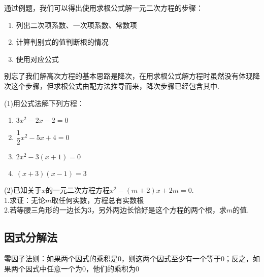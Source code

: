 通过例题，我们可以得出使用求根公式解一元二次方程的步骤：
\begin{enumerate}
    \item 列出二次项系数、一次项系数、常数项
    \item 计算判别式的值判断根的情况
    \item 使用对应公式
\end{enumerate}
\par
别忘了我们解高次方程的基本思路是降次，在用求根公式解方程时虽然没有体现降次这个步骤，但求根公式由配方法推导而来，降次步骤已经包含其中.
\begin{exercise}
\setlength{\parindent}{0pt} %
\setlength{\columnseprule}{0.01pt}
\begin{multicols}{2}
    (1)用公式法解下列方程：
    \begin{enumerate}
        \item \(3x^2-2x-2=0\)
        \item \(\dfrac{1}{2}x^2-5x+4=0\)
        \item \(2x^2-3(x+1)=0\)
        \item \((x+3)(x-1)=3\)
    \end{enumerate}
    (2)已知关于\(x\)的一元二次方程方程\(x^2-(m+2)x+2m=0\).\\
    1.求证：无论\(m\)取任何实数，方程总有实数根\\
    2.若等腰三角形的一边长为3，另外两边长恰好是这个方程的两个根，求\(m\)的值.
\end{multicols}
\end{exercise}

\subsection{因式分解法}

\begin{property}
    零因子法则：如果两个因式的乘积是0，则这两个因式至少有一个等于0；反之，如果两个因式中任意一个为0，他们的乘积为0
\end{property}

